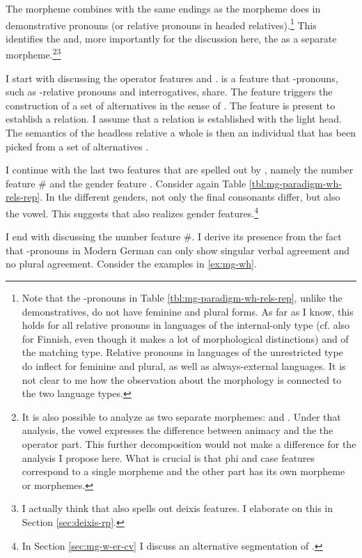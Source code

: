 The morpheme  combines with the same endings as the morpheme  does in demonstrative pronouns (or relative pronouns in headed relatives).\footnote{
Note that the -pronouns in Table \ref{tbl:mg-paradigm-wh-rels-rep}, unlike the demonstratives, do not have feminine and plural forms. As far as I know, this holds for all relative pronouns in languages of the internal-only type (cf. also for Finnish, even though it makes a lot of morphological distinctions) and of the matching type. Relative pronouns in languages of the unrestricted type do inflect for feminine and plural, as well as always-external languages.
It is not clear to me how the observation about the morphology is connected to the two language types.
}
This identifies the  and, more importantly for the discussion here, the  as a separate morpheme.\footnote{
It is also possible to analyze  as two separate morphemes:  and . Under that analysis, the vowel expresses the difference between animacy and the  the operator part. This further decomposition would not make a difference for the analysis I propose here. What is crucial is that phi and case features correspond to a single morpheme and the other part has its own morpheme or morphemes.
}\footnote{
I actually think that  also spells out deixis features. I elaborate on this in Section \ref{sec:deixis-rp}.
}

I start with discussing the operator features  and .
 is a feature that -pronouns, such as -relative pronouns and interrogatives, share. The feature triggers the construction of a set of alternatives in the sense of \citet{rooth1985,rooth1992}.
The feature  is present to establish a relation.
I assume that a relation is established with the light head. The semantics of the headless relative a whole is then an individual that has been picked from a set of alternatives \citep[cf.]{caponigro2003}.

I continue with the last two features that are spelled out by , namely the number feature \# and the gender feature . Consider again Table \ref{tbl:mg-paradigm-wh-rels-rep}. In the different genders, not only the final consonants differ, but also the vowel. This suggests that  also realizes gender features.\footnote{
In Section \ref{sec:mg-w-er-cv} I discuss an alternative segmentation of .
}

I end with discussing the number feature \#. I derive its presence from the fact that -pronouns in Modern German can only show singular verbal agreement and no plural agreement. Consider the examples in \ref{ex:mg-wh}.

